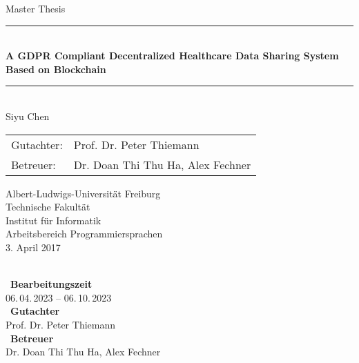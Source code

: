 \begin{titlepage}
\begin{center}

\newcommand{\HorizontalLine}{\rule{\linewidth}{0.3mm}}

{\Large Master Thesis}\\[1.3cm]


\HorizontalLine \\[0.4cm]
{ \huge \bfseries A GDPR Compliant Decentralized Healthcare Data Sharing System Based on Blockchain}
\HorizontalLine \\[1.5cm]


{\Huge Siyu Chen} \\[2cm]


\begin{tabular}[hc]{>{\huge}l >{\huge}l}
  Gutachter: & Prof. Dr. Peter Thiemann \\[0.3cm]
  Betreuer: & Dr. Doan Thi Thu Ha, Alex Fechner \\[1.2cm]
\end{tabular}
\vfill  %

\Large {
    Albert-Ludwigs-Universität Freiburg\\
    Technische Fakultät\\
    Institut für Informatik\\
    Arbeitsbereich Programmiersprachen\\[1cm]

    3. April 2017
    \\
}
\end{center}
\end{titlepage}

\thispagestyle{empty}
\ \vfill \ \\  %
\
\textbf{Bearbeitungszeit}            \smallskip{} \\
06.\,04.\,2023 -- 06.\,10.\,2023   \bigskip{} \\
\
\textbf{Gutachter}                  \smallskip{} \\
Prof. Dr. Peter Thiemann               \bigskip{} \\
\
\textbf{Betreuer}                  \smallskip{} \\
Dr. Doan Thi Thu Ha, Alex Fechner
